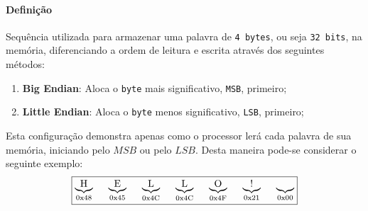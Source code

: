 \documentclass{article}
\begin{document}
            \paragraph{Definição}Sequência utilizada para armazenar uma palavra de \texttt{4 bytes}, ou seja \texttt{32 bits}, na memória, diferenciando a ordem de leitura e escrita através dos seguintes métodos:
                \begin{enumerate}[rightmargin = \leftmargin, noitemsep]
                    \item \textbf{Big Endian}: Aloca o \texttt{byte} mais significativo, \texttt{MSB}, primeiro;
                    \item \textbf{Little Endian}: Aloca o \texttt{byte} menos significativo, \texttt{LSB}, primeiro;
                \end{enumerate}
            Esta configuração demonstra apenas como o processor lerá cada palavra de sua memória, iniciando pelo $MSB$ ou pelo $LSB$. Desta maneira pode-se considerar o seguinte exemplo:
                \begin{equation}
                    \boxed{
                        \underbrace{\text{H}}_{
                            \text{0x48}
                        }
                        \hspace{5mm}
                        \underbrace{\text{E}}_{
                            \text{0x45}
                        }
                        \hspace{5mm}
                        \underbrace{\text{L}}_{
                            \text{0x4C}
                        }
                        \hspace{5mm}
                        \underbrace{\text{L}}_{
                            \text{0x4C}
                        }
                        \hspace{5mm}
                        \underbrace{\text{O}}_{
                            \text{0x4F}
                        }
                        \hspace{5mm}
                        \underbrace{\text{!}}_{
                            \text{0x21}
                        }
                        \hspace{5mm}
                        \underbrace{\text{}}_{
                            \text{0x00}
                        }
                    }
                \end{equation}\\
\end{document}
